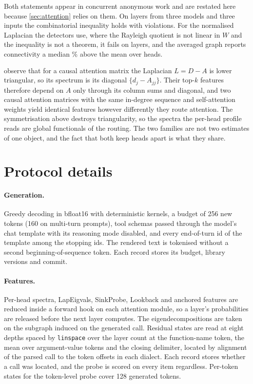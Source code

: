 Both statements appear in concurrent anonymous work and are restated here because \cref{sec:attention} relies on them. On \jensenLayers{} layers from three models and three inputs the combinatorial inequality holds with \jensenCombViolations{} violations. For the normalised Laplacian the detectors use, where the Rayleigh quotient is not linear in $W$ and the inequality is not a theorem, it fails on \jensenNormViolations{} layers, and the averaged graph reports connectivity a median \jensenRatioMedianPct{}\% above the mean over heads.

\begin{remark}
\label{rem:lapeig}
\citet{binkowski2025lapeigvals} observe that for a causal attention matrix the Laplacian $L = D - A$ is lower triangular, so its spectrum is its diagonal $\{d_j - A_{jj}\}$. Their top-$k$ features therefore depend on $A$ only through its column sums and diagonal, and two causal attention matrices with the same in-degree sequence and self-attention weights yield identical features however differently they route attention. The symmetrisation above destroys triangularity, so the spectra the per-head profile reads are global functionals of the routing. The two families are not two estimates of one object, and the fact that both keep heads apart is what they share.
\end{remark}

\section{Protocol details}
\label{app:protocol}

\paragraph{Generation.} Greedy decoding in bfloat16 with deterministic kernels, a budget of 256 new tokens (160 on multi-turn prompts), tool schemas passed through the model's chat template with its reasoning mode disabled, and every end-of-turn id of the template among the stopping ids. The rendered text is tokenised without a second beginning-of-sequence token. Each record stores its budget, library versions and commit.

\paragraph{Features.} Per-head spectra, LapEigvals, SinkProbe, Lookback and anchored features are reduced inside a forward hook on each attention module, so a layer's probabilities are released before the next layer computes. The eigendecompositions are taken on the subgraph induced on the generated call. Residual states are read at eight depths spaced by \texttt{linspace} over the layer count at the function-name token, the mean over argument-value tokens and the closing delimiter, located by alignment of the parsed call to the token offsets in each dialect. Each record stores whether a call was located, and the probe is scored on every item regardless. Per-token states for the token-level probe cover 128 generated tokens.

